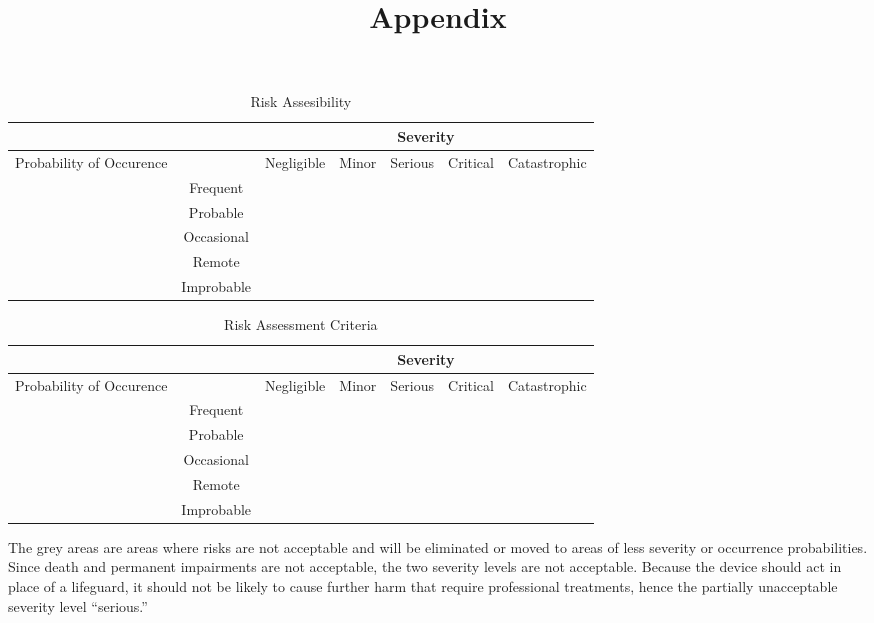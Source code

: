 \documentclass{article}[10pt]
\title{Appendix}
\begin{document}
\maketitle
\begin{table}[h!]
\begin{center}
    \begin{tabular}{ |c|c|c|c|c|c|c| }
    \hline
    &&\multicolumn{5}{c|}{Severity}\\
    \hline
    Probability of Occurence&&Negligible&Minor&Serious&Critical&Catastrophic\\
    \hline
    &Frequent&&&&&\\
    \hline
    &Probable&&&&&\\
    \hline
    &Occasional&&&&&\\
    \hline
    &Remote&&&&&\\
    \hline
    &Improbable&&&&&\\
    \hline
\end{tabular} 
\caption{Risk Assesibility}
\label{tab:Figure}

\end{center}
\end{table}
\begin{table}[h!]
    \begin{center}
        \begin{tabular}{ |c|c|c|c|c|c|c| }
        \hline
        &&\multicolumn{5}{c|}{Severity}\\
        \hline
        Probability of Occurence&&Negligible&Minor&Serious&Critical&Catastrophic\\
        \hline
        &Frequent&&&\cellcolor{gray}&\cellcolor{gray}&\cellcolor{gray}\\
        \hline
        &Probable&&&\cellcolor{gray}&\cellcolor{gray}&\cellcolor{gray}\\
        \hline
        &Occasional&&&&\cellcolor{gray}&\cellcolor{gray}\\
        \hline
        &Remote&&&&\cellcolor{gray}&\cellcolor{gray}\\
        \hline
        &Improbable&&&&\cellcolor{gray}&\cellcolor{gray}\\
        \hline
    \end{tabular} 
    \caption{Risk Assessment Criteria}
    \label{tab:Figure}
    
    \end{center}
    \end{table}
    The grey areas are areas where risks are not acceptable and will be eliminated or moved to 
    areas of less severity or occurrence probabilities. Since death and permanent impairments are not acceptable, 
    the two severity levels are not acceptable. Because the device should act in place of a lifeguard, it should not be 
    likely to cause further harm that require professional treatments, hence the partially unacceptable severity level “serious.” \\
    
\end{document}
